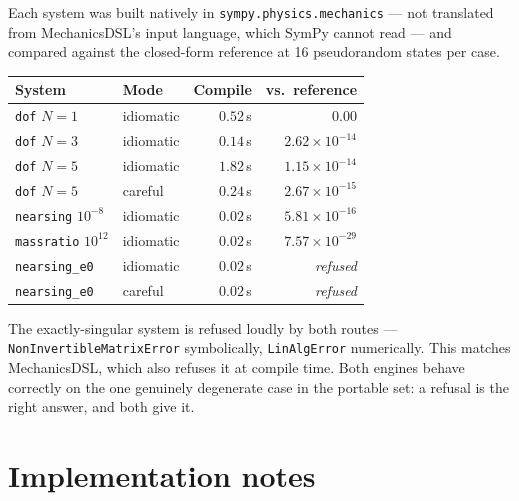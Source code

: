 \documentclass[11pt,a4paper]{article}
\begin{document}
Each system was built natively in \texttt{sympy.physics.mechanics} --- not
translated from MechanicsDSL's input language, which SymPy cannot read --- and
compared against the closed-form reference at 16 pseudorandom states per case.

\begin{center}
\begin{tabular}{@{}llrr@{}}
\toprule
\textbf{System} & \textbf{Mode} & \textbf{Compile} & \textbf{vs.\ reference} \\
\midrule
\texttt{dof} $N=1$      & idiomatic & $0.52$\,s & $0.00$ \\
\texttt{dof} $N=3$      & idiomatic & $0.14$\,s & $2.62\times10^{-14}$ \\
\texttt{dof} $N=5$      & idiomatic & $1.82$\,s & $1.15\times10^{-14}$ \\
\texttt{dof} $N=5$      & careful   & $0.24$\,s & $2.67\times10^{-15}$ \\
\texttt{nearsing} $10^{-8}$ & idiomatic & $0.02$\,s & $5.81\times10^{-16}$ \\
\texttt{massratio} $10^{12}$ & idiomatic & $0.02$\,s & $7.57\times10^{-29}$ \\
\midrule
\texttt{nearsing\_e0}   & idiomatic & $0.02$\,s & \emph{refused} \\
\texttt{nearsing\_e0}   & careful   & $0.02$\,s & \emph{refused} \\
\bottomrule
\end{tabular}
\end{center}

\noindent The exactly-singular system is refused loudly by both routes ---
\texttt{NonInvertibleMatrixError} symbolically, \texttt{LinAlgError}
numerically. This matches MechanicsDSL, which also refuses it at compile time.
Both engines behave correctly on the one genuinely degenerate case in the
portable set: a refusal is the right answer, and both give it.

\section{Implementation notes}
\end{document}
